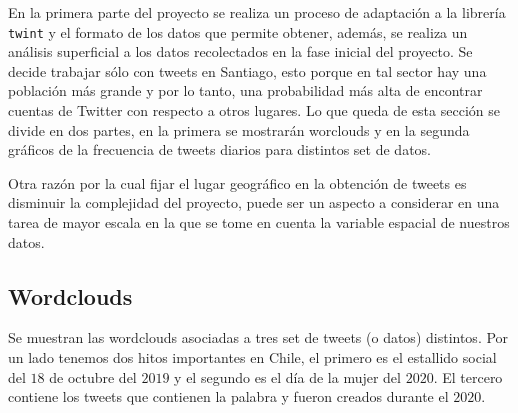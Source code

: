 \documentclass{article}
\begin{document}
En la primera parte del proyecto se realiza un proceso de adaptación a la librería \texttt{twint} y el formato de los datos que permite obtener, además, se realiza un análisis superficial a los datos recolectados en la fase inicial del proyecto. Se decide trabajar sólo con tweets en Santiago, esto porque en tal sector hay una población más grande y por lo tanto, una probabilidad más alta de encontrar cuentas de Twitter con respecto a otros lugares. Lo que queda de esta sección se divide en dos partes, en la primera se mostrarán worclouds y en la segunda gráficos de la frecuencia de tweets diarios para distintos set de datos.

\begin{remark}
	Otra razón por la cual fijar el lugar geográfico en la obtención de tweets es disminuir la complejidad del proyecto, puede ser un aspecto a considerar en una tarea de mayor escala en la que se tome en cuenta la variable espacial de nuestros datos.	
\end{remark}

\subsection{Wordclouds}
	Se muestran las wordclouds asociadas a tres set de tweets (o datos) distintos. Por un lado tenemos dos hitos importantes en Chile, el primero es el estallido social del $18$ de octubre del $2019$ y el segundo es el día de la mujer del $2020$. El tercero contiene los tweets que contienen la palabra  y fueron creados durante el $2020$.
	
	
	
\end{document}
